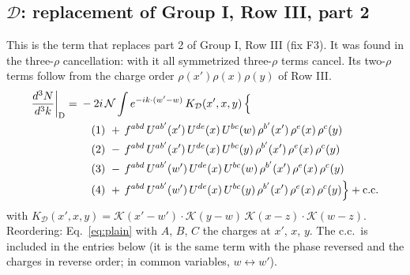 \documentclass[10pt]{article}
\numberwithin{equation}{section}
\newcommand{\KK}{\mathcal K}
\newcommand{\NN}{\mathcal N}
\begin{document}
\subsection{\texorpdfstring{$\mathcal D$}{D}: replacement of Group I, Row III, part 2}\label{src:D}
This is the term that replaces part 2 of Group I, Row III (fix F3). It was found in the three-$\rho$ cancellation: with it all symmetrized three-$\rho$ terms cancel. Its two-$\rho$ terms follow from the charge order $\rho(x')\rho(x)\rho(y)$ of Row III.
\begin{align}
\frac{d^3N}{d^3k}\bigg|_{\rm D}={}&-2i\,\NN\int e^{-ik\cdot(w'-w)}\,K_{\mathcal D}(x',x,y)\,\Big\{\notag\\
&\quad (1)\ +\,f^{abd}\,U^{ab'}(x')\,U^{de}(x)\,U^{bc}(w)\,\rho^{b'}(x')\,\rho^{e}(x)\,\rho^{c}(y)\notag\\
&\quad (2)\ -\,f^{abd}\,U^{ab'}(x')\,U^{de}(x)\,U^{bc}(y)\,\rho^{b'}(x')\,\rho^{e}(x)\,\rho^{c}(y)\notag\\
&\quad (3)\ -\,f^{abd}\,U^{ab'}(w')\,U^{de}(x)\,U^{bc}(w)\,\rho^{b'}(x')\,\rho^{e}(x)\,\rho^{c}(y)\notag\\
&\quad (4)\ +\,f^{abd}\,U^{ab'}(w')\,U^{de}(x)\,U^{bc}(y)\,\rho^{b'}(x')\,\rho^{e}(x)\,\rho^{c}(y)\Big\}+{\rm c.c.}\label{eq:in-D}
\end{align}
with $K_{\mathcal D}(x',x,y)=\KK(x'-w')\cdot\KK(y-w)\,\KK(x-z)\cdot\KK(w-z)$.
Reordering: Eq.~\eqref{eq:plain} with $A$, $B$, $C$ the charges at $x'$, $x$, $y$.
The c.c.\ is included in the entries below (it is the same term with the phase reversed and the charges in reverse order; in common variables, $w\leftrightarrow w'$).
\end{document}
